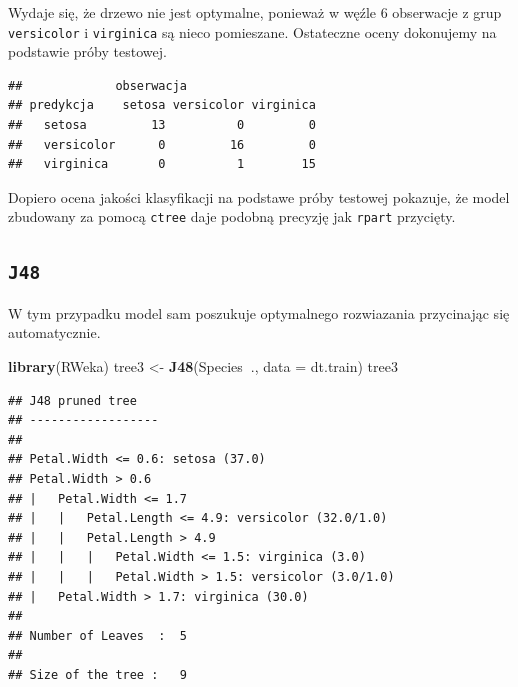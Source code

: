 \documentclass[]{book}
\newenvironment{Shaded}{\begin{snugshade}}{\end{snugshade}}
\newcommand{\DataTypeTok}[1]{\textcolor[rgb]{0.13,0.29,0.53}{#1}}
\newcommand{\KeywordTok}[1]{\textcolor[rgb]{0.13,0.29,0.53}{\textbf{#1}}}
\newcommand{\NormalTok}[1]{#1}
\newcommand{\OperatorTok}[1]{\textcolor[rgb]{0.81,0.36,0.00}{\textbf{#1}}}
\newcommand{\StringTok}[1]{\textcolor[rgb]{0.31,0.60,0.02}{#1}}
\theoremstyle{plain}
\theoremstyle{definition}
\begin{document}
Wydaje się, że drzewo nie jest optymalne, ponieważ w węźle 6 obserwacje z grup \texttt{versicolor} i \texttt{virginica} są nieco pomieszane. Ostateczne oceny dokonujemy na podstawie próby testowej.

\begin{Shaded}
\end{Shaded}

\begin{verbatim}
##             obserwacja
## predykcja    setosa versicolor virginica
##   setosa         13          0         0
##   versicolor      0         16         0
##   virginica       0          1        15
\end{verbatim}

Dopiero ocena jakości klasyfikacji na podstawe próby testowej pokazuje, że model zbudowany za pomocą \texttt{ctree} daje podobną precyzję jak \texttt{rpart} przycięty.

\hypertarget{j48}{%
\subsection{\texorpdfstring{\texttt{J48}}{J48}}\label{j48}}

W tym przypadku model sam poszukuje optymalnego rozwiazania przycinając się automatycznie.

\begin{Shaded}
\begin{Highlighting}[]
\KeywordTok{library}\NormalTok{(RWeka)}
\NormalTok{tree3 <-}\StringTok{ }\KeywordTok{J48}\NormalTok{(Species}\OperatorTok{~}\NormalTok{., }\DataTypeTok{data =}\NormalTok{ dt.train)}
\NormalTok{tree3}
\end{Highlighting}
\end{Shaded}

\begin{verbatim}
## J48 pruned tree
## ------------------
## 
## Petal.Width <= 0.6: setosa (37.0)
## Petal.Width > 0.6
## |   Petal.Width <= 1.7
## |   |   Petal.Length <= 4.9: versicolor (32.0/1.0)
## |   |   Petal.Length > 4.9
## |   |   |   Petal.Width <= 1.5: virginica (3.0)
## |   |   |   Petal.Width > 1.5: versicolor (3.0/1.0)
## |   Petal.Width > 1.7: virginica (30.0)
## 
## Number of Leaves  :  5
## 
## Size of the tree :   9
\end{verbatim}
\end{document}
